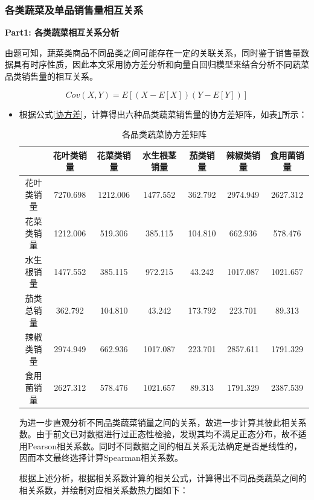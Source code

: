 \documentclass{my_paper}
\begin{document}
\subsubsection{各类蔬菜及单品销售量相互关系}
\textbf{Part1: 各类蔬菜相互关系分析}\par
由题可知，蔬菜类商品不同品类之间可能存在一定的关联关系，同时鉴于销售量数据具有时序性质，因此本文采用协方差分析和向量自回归模型来结合分析不同蔬菜品类销售量的相互关系。\par
\begin{equation}
    Cov(X,Y)=E[(X-E[X])(Y-E[Y])]
    \label{协方差}
\end{equation}


\begin{itemize}
    \item 根据公式\ref{协方差}，计算得出六种品类蔬菜销售量的协方差矩阵，如表\ref{品类协方差矩阵}所示：
\begin{table}[H]
    \centering
    \caption{各品类蔬菜协方差矩阵}
    \label{品类协方差矩阵}
    \begin{tabular}{ccccccc}
    \toprule
        ~ & 花叶类销量 & 花菜类销量 & 水生根茎销量 & 茄类销量 & 辣椒类销量 & 食用菌销量 \\ 
        \midrule
        花叶类销量 & 7270.698 & 1212.006 & 1477.552 & 362.792 & 2974.949 & 2627.312 \\ 
        花菜类销量 & 1212.006 & 519.306 & 385.115 & 104.810 & 662.936 & 578.476 \\ 
        水生根销量 & 1477.552 & 385.115 & 972.215 & 43.242 & 1017.087 & 1021.657 \\ 
        茄类总销量 & 362.792 & 104.810 & 43.242 & 173.792 & 223.701 & 89.313 \\ 
        辣椒类销量 & 2974.949 & 662.936 & 1017.087 & 223.701 & 2857.611 & 1791.329 \\ 
        食用菌销量 & 2627.312 & 578.476 & 1021.657 & 89.313 & 1791.329 & 2387.539 \\ 
        \bottomrule
    \end{tabular}
\end{table}\par
为进一步直观分析不同品类蔬菜销量之间的关系，故进一步计算其彼此相关系数。由于前文已对数据进行过正态性检验，发现其均不满足正态分布，故不适用Pearson相关系数。同时不同数据之间的相互关系无法确定是否是线性的，因而本文最终选择计算Spearman相关系数。\par
    根据上述分析，根据相关系数计算的相关公式，计算得出不同品类蔬菜之间的相关系数，并绘制对应相关系数热力图如下：
    \begin{figure}[H]

\end{figure}
\end{itemize}
\end{document}
